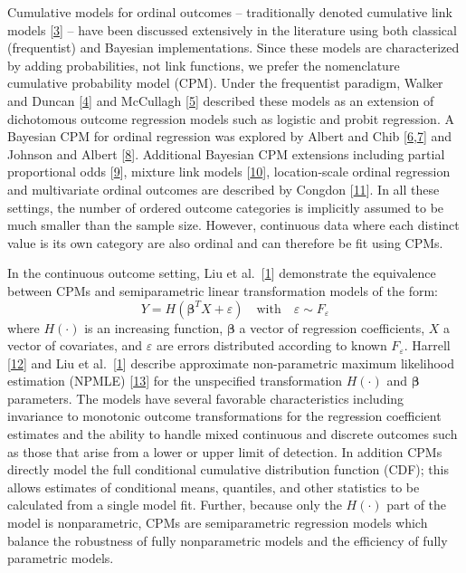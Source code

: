 \documentclass[
]{article}
\begin{document}
Cumulative models for ordinal outcomes -- traditionally denoted cumulative link models {{[}\protect\hyperlink{ref-agresti_categorical_2002}{3}{]}} -- have been discussed extensively in the literature using both classical (frequentist) and Bayesian implementations. Since these models are characterized by adding probabilities, not link functions, we prefer the nomenclature cumulative probability model (CPM). Under the frequentist paradigm, Walker and Duncan {{[}\protect\hyperlink{ref-walker_estimation_1967}{4}{]}} and McCullagh {{[}\protect\hyperlink{ref-peter_mccullagh_regression_1980}{5}{]}} described these models as an extension of dichotomous outcome regression models such as logistic and probit regression. A Bayesian CPM for ordinal regression was explored by Albert and Chib {{[}\protect\hyperlink{ref-albert_bayesian_1993}{6},\protect\hyperlink{ref-albert_bayesian_1997}{7}{]}} and Johnson and Albert {{[}\protect\hyperlink{ref-johnson_ordinal_1999}{8}{]}}. Additional Bayesian CPM extensions including partial proportional odds {{[}\protect\hyperlink{ref-peterson_partial_1990}{9}{]}}, mixture link models {{[}\protect\hyperlink{ref-lang_bayesian_1999}{10}{]}}, location-scale ordinal regression and multivariate ordinal outcomes are described by Congdon {{[}\protect\hyperlink{ref-congdon_bayesian_2005}{11}{]}}. In all these settings, the number of ordered outcome categories is implicitly assumed to be much smaller than the sample size. However, continuous data where each distinct value is its own category are also ordinal and can therefore be fit using CPMs.

In the continuous outcome setting, Liu et al.~{{[}\protect\hyperlink{ref-liu_modeling_2017}{1}{]}} demonstrate the equivalence between CPMs and semiparametric linear transformation models of the form:
\begin{equation}
Y=H(\boldsymbol{\beta}^{T}X+\varepsilon) \quad \text{with} \quad \varepsilon \sim F_{\varepsilon}
\end{equation}
where \(H(\cdot)\) is an increasing function, \(\boldsymbol{\beta}\) a vector of regression coefficients, \(X\) a vector of covariates, and \(\varepsilon\) are errors distributed according to known \(F_{\varepsilon}\). Harrell {{[}\protect\hyperlink{ref-harrell_regression_2015}{12}{]}} and Liu et al.~{{[}\protect\hyperlink{ref-liu_modeling_2017}{1}{]}} describe approximate non-parametric maximum likelihood estimation (NPMLE) {{[}\protect\hyperlink{ref-zeng_maximum_2007}{13}{]}} for the unspecified transformation \(H(\cdot)\) and \(\boldsymbol{\beta}\) parameters. The models have several favorable characteristics including invariance to monotonic outcome transformations for the regression coefficient estimates and the ability to handle mixed continuous and discrete outcomes such as those that arise from a lower or upper limit of detection. In addition CPMs directly model the full conditional cumulative distribution function (CDF); this allows estimates of conditional means, quantiles, and other statistics to be calculated from a single model fit. Further, because only the \(H(\cdot)\) part of the model is nonparametric, CPMs are semiparametric regression models which balance the robustness of fully nonparametric models and the efficiency of fully parametric models.
\end{document}
